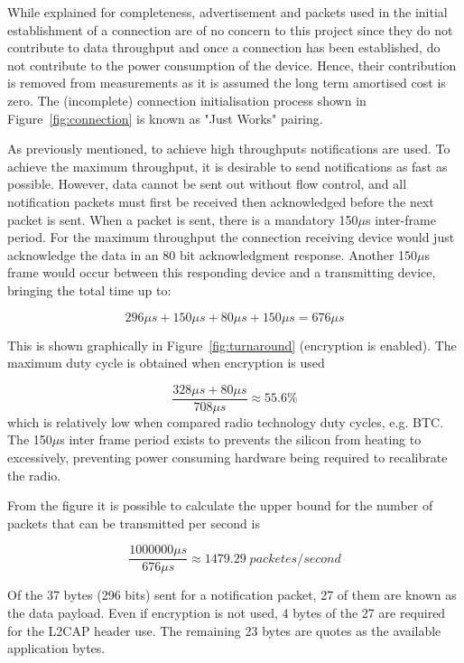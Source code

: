 \documentclass[]{article}
\begin{document}
While explained for completeness, advertisement and packets used in the initial establishment of a connection are of no concern to this project since they do not contribute to data throughput and once a connection has been established, do not contribute to the power consumption of the device. Hence, their contribution is removed from measurements as it is assumed the long term amortised cost is zero. The (incomplete) connection initialisation process shown in Figure~\ref{fig:connection} is known as "Just Works" pairing.



As previously mentioned, to achieve high throughputs notifications are used. To achieve the maximum throughput, it is desirable to send notifications as fast as possible. However, data cannot be sent out without flow control, and all notification packets must first be received then acknowledged before the next packet is sent. When a packet is sent, there is a mandatory 150$\mu$s inter-frame period. For the maximum throughput the connection receiving device would just acknowledge the data in an 80 bit acknowledgment response. Another 150$\mu$s frame would occur between this responding device and a transmitting device, bringing the total time up to:

\begin{displaymath}
296\mu s + 150\mu s + 80\mu s + 150\mu s = 676\mu s
\end{displaymath}

 This is shown graphically in Figure~\ref{fig:turnaround} (encryption is enabled). The maximum duty cycle is obtained when encryption is used 

\begin{displaymath}
\frac{328\mu s + 80\mu s}{708\mu s} \approx 55.6\%
\end{displaymath}
which is relatively low when compared radio technology duty cycles, e.g. \ac{BTC}. The 150$\mu$s inter frame period exists to prevents the silicon from heating to excessively, preventing power consuming hardware being required to recalibrate the radio. 

From the figure it is possible to calculate the upper bound for the number of packets that can be transmitted per second is

\begin{displaymath}\frac{1000000\mu s}{676\mu s} \approx  1479.29\;packetes/second\end{displaymath}

Of the 37 bytes (296 bits) sent for a notification packet, 27 of them are known as the data payload. Even if encryption is not used, 4 bytes of the 27 are required for the L2CAP header use. The remaining 23 bytes are quotes as the available application bytes.
\end{document}
